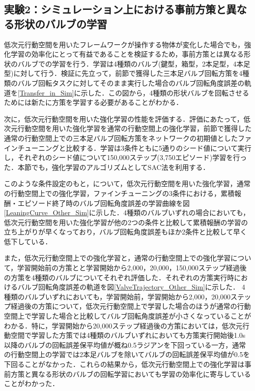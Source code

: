 \documentclass[dvipdfmx]{ampbt_nomag}
\begin{document}
\subsection{実験2：シミュレーション上における事前方策と異なる形状のバルブの学習}
低次元行動空間を用いたフレームワークが操作する物体が変化した場合でも，強化学習の効率化にとって有益であることを検証するため，事前方策とは異なる形状のバルブでの学習を行う．学習は4種類のバルブ(鍵型，箱型，2本足型，4本足型)に対して行う．検証に先立って，前節で獲得した三本足バルブ回転方策を4種類のバルブ回転タスクに対してそのまま実行した場合のバルブ回転角度誤差の軌道を\ref{Transfer_in_Sim}に示した．この図から，4種類の形状バルブを回転させるためには新たに方策を学習する必要があることがわかる．

次に，低次元行動空間を用いた強化学習の性能を評価する．評価にあたって，低次元行動空間を用いた強化学習を通常の行動空間上の強化学習，前節で獲得した通常の行動空間上での三本足バルブ回転方策をネットワークの初期値としたファインチューニングと比較する．学習は3条件ともに5通りのシード値について実行し，それぞれのシード値について150,000ステップ(3,750エピソード)学習を行った．本節でも，強化学習のアルゴリズムとしてSAC法を利用する．

このような条件設定のもと，について，低次元行動空間を用いた強化学習，通常の行動空間上での強化学習，ファインチューニングの3条件における，累積報酬・エピソード終了時のバルブ回転角度誤差の学習曲線を図\ref{LeaningCurve_Other_Sim}に示した．4種類のバルブいずれの場合においても，低次元行動空間を用いた強化学習が他の2つの条件と比較して累積報酬の学習の立ち上がりが早くなっており，バルブ回転角度誤差もほか2条件と比較して早く低下している．

また，低次元行動空間上での強化学習と，通常の行動空間上での強化学習について，学習開始前の方策とと学習開始から2,000，20,000，150,000ステップ経過後の方策を4種類のバルブについてそれぞれ評価した．それぞれの方策実行時におけるバルブ回転角度誤差の軌道を図\ref{ValveTrajectory_Other_Sim}に示した．
4種類のバルブいずれにおいても，学習開始前，学習開始から2,000，20,000ステップ経過後の方策について，低次元行動空間上で学習した場合のほうが通常の行動空間上で学習した場合と比較してバルブ回転角度誤差が小さくなっていることがわかる．特に，学習開始から20,000ステップ経過後の方策においては，低次元行動空間で学習した方策では4種類のバルブいずれにおいても方策実行開始後1.0s以降のバルブの回転誤差保平均値が概ね0.5ラジアンを下回っている一方，通常の行動空間上の学習では2本足バルブを除いてバルブの回転誤差保平均値が0.5を下回ることがなかった．これらの結果から，低次元行動空間上での強化学習は事前方策と異なる形状のバルブの回転学習においても学習の効率化に寄与していることがわかった．
\end{document}

